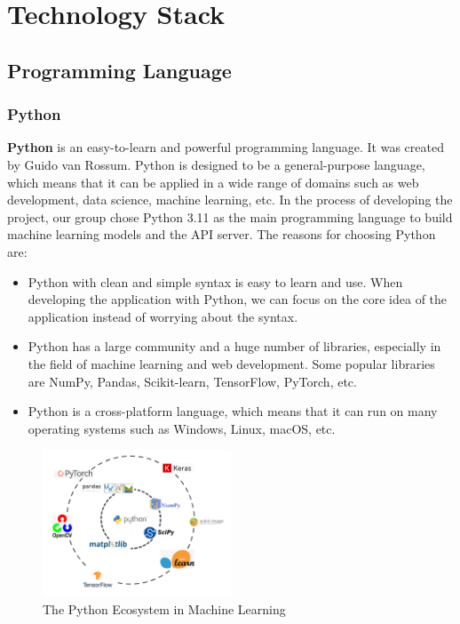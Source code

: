\chapter{Technology Stack}

\section{Programming Language}

\subsection{Python}
\textbf{Python} is an easy-to-learn and powerful programming language. It was created by Guido van Rossum. Python is designed to be a general-purpose language, which means that it can be applied in a wide range of domains such as web development, data science, machine learning, etc. In the process of developing the project, our group chose Python 3.11 as the main programming language to build machine learning models and the API server. The reasons for choosing Python are:
\begin{itemize}
    \item Python with clean and simple syntax is easy to learn and use. When developing the application with Python, we can focus on the core idea of the application instead of worrying about the syntax.
    \item Python has a large community and a huge number of libraries, especially in the field of machine learning and web development. Some popular libraries are NumPy, Pandas, Scikit-learn, TensorFlow, PyTorch, etc.
    \item Python is a cross-platform language, which means that it can run on many operating systems such as Windows, Linux, macOS, etc.
\end{itemize}

\begin{figure}[ht]
    \centering
    \includegraphics[width=0.5\textwidth]{Images/8.Technology_Stack/python_ecosystem.png}
    \caption{The Python Ecosystem in Machine Learning}
    \label{fig:python_ecosystem}
\end{figure}

